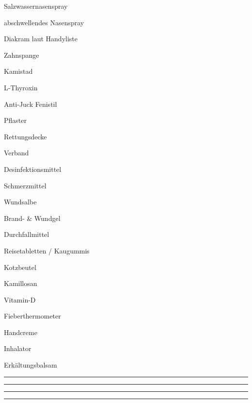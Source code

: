 
\begin{VIERitemize}
    \item{Salzwassernasenspray}
    \item{abschwellendes Nasenspray}
\end{VIERitemize}

\begin{ONEitemize}
    \item{Diakram laut Handyliste}
    \item{Zahnspange}
    \item{Kamistad}
    \item{L-Thyroxin}
    \item{Anti-Juck Fenistil}
    \item{Pflaster}
    \item{Rettungsdecke}
    \item{Verband}
    \item{Desinfektionsmittel}
    \item{Schmerzmittel}
    \item{Wundsalbe}
    \item{Brand- \& Wundgel}
    \item{Durchfallmittel}
    \item{Reisetabletten / Kaugummis}
    \item{Kotzbeutel}
    \item{Kamillosan}
    \item{Vitamin-D}
    \item{Fieberthermometer}
    \item{Handcreme}
    \item{Inhalator}
    \item{Erkältungsbalsam}
    \item{\rule{50mm}{0.4pt}}
    \item{\rule{50mm}{0.4pt}}
    \item{\rule{50mm}{0.4pt}}
    \item{\rule{50mm}{0.4pt}}
\end{ONEitemize}
